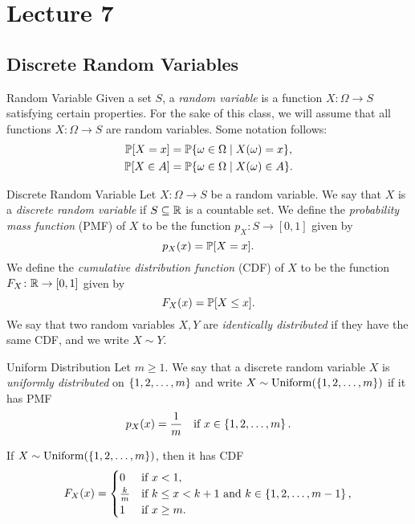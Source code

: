 \documentclass[class=article, crop=false]{standalone}
\begin{document}
  \section{Lecture 7}
  \subsection{Discrete Random Variables}
  \begin{definition}{Random Variable}
    Given a set $S$, a \emph{random variable} is a function $X\colon \Omega\to S$ satisfying certain properties. For the sake of this class, we will assume that all functions $X\colon \Omega\to S$ are random variables. Some notation follows:
    \begin{align*}
      \P[X = x] &= \P{\set{\omega\in\Omega\mid X(\omega) = x}}, \\
      \P[X\in A] &= \P{\set{\omega\in\Omega\mid X(\omega)\in A}}.
    \end{align*}
  \end{definition}
  \begin{definition}{Discrete Random Variable}
    Let $X\colon \Omega\to S$ be a random variable. We say that $X$ is a \emph{discrete random variable} if $S\sse \R$ is a countable set. We define the \emph{probability mass function} (PMF) of $X$ to be the function $p_X\colon S\to [0, 1]$ given by
    \[
      p_X(x) = \P[X = x].
    \]
    We define the \emph{cumulative distribution function} (CDF) of $X$ to be the function $F_X\colon \R\to [0, 1]$ given by
    \[
      F_X(x) = \P[X \leq x].
    \]
    We say that two random variables $X, Y$ are \emph{identically distributed} if they have the same CDF, and we write $X\sim Y$.
  \end{definition}
  \begin{definition}{Uniform Distribution}
    Let $m \geq 1$. We say that a discrete random variable $X$ is \emph{uniformly distributed} on $\set{1, 2, \dotsc, m}$ and write $X\sim\Uniform(\set{1,2,\dotsc,m})$ if it has PMF
    \[
      p_X(x) = \frac{1}{m}\quad\text{if } x\in \set{1,2,\dotsc,m}.
    \]
  \end{definition}
  If $X\sim\Uniform (\set{1,2,\dotsc,m})$, then it has CDF
  \[
    F_X(x) = \begin{cases}
      0 & \text{if } x < 1, \\
      \frac{k}{m} & \text{if } k\leq x < k + 1 \text{ and } k\in \set{1,2,\dotsc,m - 1}, \\
      1 & \text{if }x \geq m.
    \end{cases}
  \]
\end{document}
